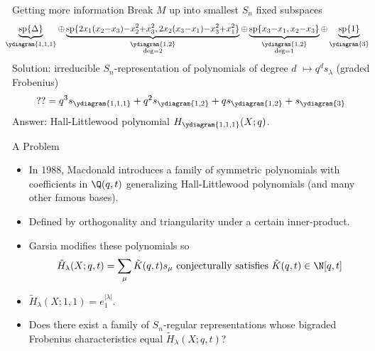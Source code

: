 \documentclass[dvipsnames]{beamer}
\renewcommand{\Span}{\operatorname{sp}}
\theoremstyle{definition}
\begin{document}
\begin{frame}{Getting more information}
  \pause
  Break \(M\) up into smallest \(S_n\) fixed subspaces 
  \[
    \hspace{-0.75em}
    \scalebox{0.95}{\(
      \underbrace{\Span\{\Delta\}}_{\ydiagram{1,1,1}} {\oplus} \underbrace{\Span\{2x_1(x_2{-}x_3){-}x_2^2{+}x_3^2,
        2x_2(x_3{-}x_1){-}x_3^2{+}x_1^2\}}_{\substack{\ydiagram{1,2}\\\deg
        = 2}} {\oplus}
      \underbrace{\Span\{x_3{-}x_1, x_2{-}x_3\}}_{\substack{\ydiagram{1,2}\\\deg=1}} {\oplus} \underbrace{\Span\{1\}}_{\ydiagram{3}}\)}
  \]
  \pause
  Solution: irreducible \(S_n\)-representation of polynomials of degree \(d\) \(\mapsto q^d
  s_\lambda\) (graded Frobenius)\[
    ?? = q^3 s_{\ydiagram{1,1,1}} + q^2 s_{\ydiagram{1,2}} + q
    s_{\ydiagram{1,2}} + s_{\ydiagram{3}}
  \]\pause
  Answer: Hall-Littlewood polynomial \(H_{\ydiagram{1,1,1}}(X;q)\).
\end{frame}
\begin{frame}{A Problem}
  \begin{itemize}
  \item In 1988, Macdonald introduces a family of symmetric
    polynomials with coefficients in \(\Q(q,t)\) generalizing
    Hall-Littlewood polynomials (and many other famous bases).\pause
  \item Defined by orthogonality and triangularity under a certain
    inner-product. \pause
  \item Garsia modifies these polynomials so 
    \[
      \tilde{H}_\lambda(X;q,t) = \sum_\mu \tilde{K}(q,t) s_\mu \text{
        conjecturally satisfies }\tilde{K}(q,t) \in \N[q,t]
    \]\pause
  \item \(\tilde{H}_\lambda(X;1,1) = e_1^{|\lambda|}\).\pause
  \item Does there
    exist a family of \(S_n\)-regular representations whose bigraded
    Frobenius characteristics equal \(\tilde{H}_\lambda(X;q,t)\)?
  \end{itemize}
\end{frame}
\end{document}
